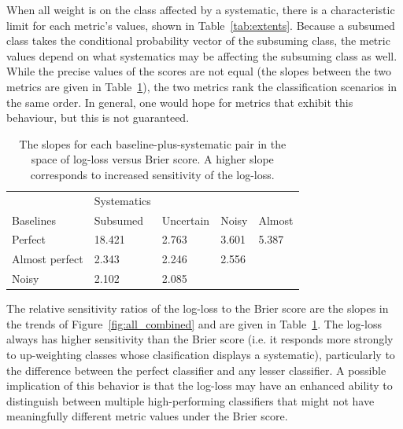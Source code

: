 When all weight is on the class affected by a systematic, there is a characteristic limit for each metric's values, shown in Table~\ref{tab:extents}. Because a subsumed class takes the conditional probability vector of the subsuming class, the metric values depend on what systematics may be affecting the subsuming class as well. While the precise values of the scores are not equal (the slopes between the two metrics are given in Table~\ref{tab:slopes}), the two metrics rank the classification scenarios in the same order. 
In general, one would hope for metrics that exhibit this behaviour, but this is not guaranteed.



\begin{table}[]
\begin{tabular}{l|llll}
	& Systematics & & &\\
Baselines & Subsumed & Uncertain & Noisy & Almost\\
\hline
Perfect & 18.421 & 2.763 & 3.601 & 5.387\\
Almost perfect & 2.343 & 2.246 & 2.556 & \\
Noisy & 2.102 & 2.085 & &
\end{tabular}
\caption{The slopes for each baseline-plus-systematic pair in the space of log-loss versus Brier score.
A higher slope corresponds to increased sensitivity of the log-loss.}
\label{tab:slopes}
\end{table}

The relative sensitivity ratios of the log-loss to the Brier score are the slopes in the trends of Figure~\ref{fig:all_combined} and are given in Table~\ref{tab:slopes}.
The log-loss always has higher sensitivity than the Brier score (i.e. it responds more strongly to up-weighting classes whose clasification displays a systematic), particularly to the difference between the perfect classifier and any lesser classifier.
A possible implication of this behavior is that the log-loss may have an enhanced ability to distinguish between multiple high-performing classifiers that might not have meaningfully different metric values under the Brier score.


